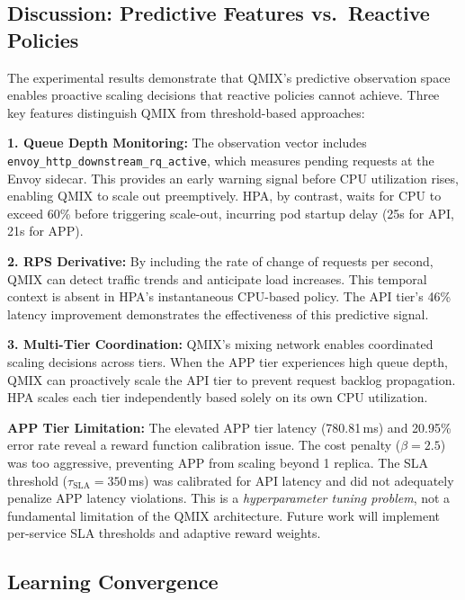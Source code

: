 \documentclass[conference]{IEEEtran}
\begin{document}
\subsection{Discussion: Predictive Features vs.\ Reactive Policies}

The experimental results demonstrate that QMIX's predictive observation
space enables proactive scaling decisions that reactive policies cannot
achieve. Three key features distinguish QMIX from threshold-based
approaches:

\textbf{1. Queue Depth Monitoring:} The observation vector includes
\texttt{envoy\_http\_downstream\_rq\_active}, which measures pending
requests at the Envoy sidecar. This provides an early warning signal
before CPU utilization rises, enabling QMIX to scale out preemptively.
HPA, by contrast, waits for CPU to exceed 60\% before triggering
scale-out, incurring pod startup delay (25s for API, 21s for APP).

\textbf{2. RPS Derivative:} By including the rate of change of requests
per second, QMIX can detect traffic trends and anticipate load increases.
This temporal context is absent in HPA's instantaneous CPU-based policy.
The API tier's 46\% latency improvement demonstrates the effectiveness
of this predictive signal.

\textbf{3. Multi-Tier Coordination:} QMIX's mixing network enables
coordinated scaling decisions across tiers. When the APP tier experiences
high queue depth, QMIX can proactively scale the API tier to prevent
request backlog propagation. HPA scales each tier independently based
solely on its own CPU utilization.

\textbf{APP Tier Limitation:} The elevated APP tier latency (780.81\,ms)
and 20.95\% error rate reveal a reward function calibration issue. The
cost penalty ($\beta = 2.5$) was too aggressive, preventing APP from
scaling beyond 1 replica. The SLA threshold ($\tau_{\mathrm{SLA}} = 350$\,ms)
was calibrated for API latency and did not adequately penalize APP
latency violations. This is a \textit{hyperparameter tuning problem},
not a fundamental limitation of the QMIX architecture. Future work will
implement per-service SLA thresholds and adaptive reward weights.

\subsection{Learning Convergence}
\end{document}
